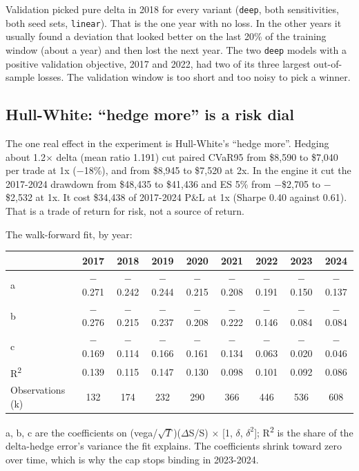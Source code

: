 \documentclass{article}
\begin{document}
Validation picked pure delta in 2018 for every variant (\texttt{deep}, both sensitivities, both seed sets, \texttt{linear}). That is the one year with no loss. In the other years it usually found a deviation that looked better on the last 20\% of the training window (about a year) and then lost the next year. The two \texttt{deep} models with a positive validation objective, 2017 and 2022, had two of its three largest out-of-sample losses. The validation window is too short and too noisy to pick a winner.

\subsection{Hull-White: ``hedge more'' is a risk dial}

The one real effect in the experiment is Hull-White's ``hedge more''. Hedging about 1.2\ensuremath{\times} delta (mean ratio 1.191) cut paired CVaR95 from \$8,590 to \$7,040 per trade at 1x ($-$18\%), and from \$8,945 to \$7,520 at 2x. In the engine it cut the 2017-2024 drawdown from \$48,435 to \$41,436 and ES 5\% from $-$\$2,705 to $-$\$2,532 at 1x. It cost \$34,438 of 2017-2024 P\&L at 1x (Sharpe 0.40 against 0.61). That is a trade of return for risk, not a source of return.

The walk-forward fit, by year:

\begin{center}\small
\begin{tabular}{lcccccccc}
\toprule
 & \textbf{2017} & \textbf{2018} & \textbf{2019} & \textbf{2020} & \textbf{2021} & \textbf{2022} & \textbf{2023} & \textbf{2024} \\
\midrule
a & $-$0.271 & $-$0.242 & $-$0.244 & $-$0.215 & $-$0.208 & $-$0.191 & $-$0.150 & $-$0.137 \\
b & $-$0.276 & $-$0.215 & $-$0.237 & $-$0.208 & $-$0.222 & $-$0.146 & $-$0.084 & $-$0.084 \\
c & $-$0.169 & $-$0.114 & $-$0.166 & $-$0.161 & $-$0.134 & $-$0.063 & $-$0.020 & $-$0.046 \\
R\textsuperscript{2} & 0.139 & 0.115 & 0.147 & 0.130 & 0.098 & 0.101 & 0.092 & 0.086 \\
Observations (k) & 132 & 174 & 232 & 290 & 366 & 446 & 536 & 608 \\
\bottomrule
\end{tabular}
\end{center}

a, b, c are the coefficients on (vega/\ensuremath{\sqrt{T}})(\ensuremath{\Delta}S/S) \ensuremath{\times} [1, \ensuremath{\delta}, \ensuremath{\delta^2}]; R\textsuperscript{2} is the share of the delta-hedge error's variance the fit explains. The coefficients shrink toward zero over time, which is why the cap stops binding in 2023-2024.
\end{document}
